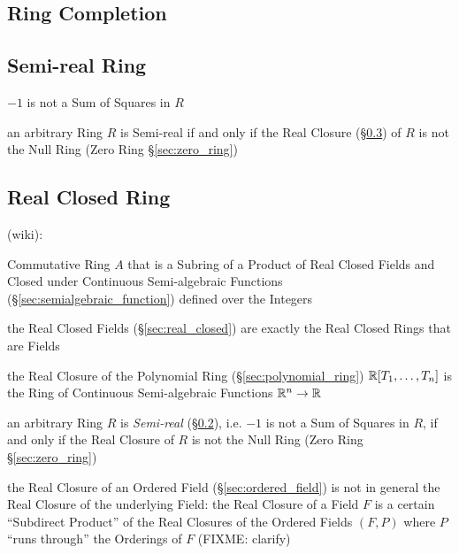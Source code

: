 \begin{itemize}
\subsection{Ring Completion}\label{sec:ring_completion}

\subsection{Semi-real Ring}\label{sec:semireal_ring}

$-1$ is not a Sum of Squares in $R$

an arbitrary Ring $R$ is Semi-real if and only if the Real Closure
(\S\ref{sec:real_closed_ring}) of $R$ is not the Null Ring
(Zero Ring \S\ref{sec:zero_ring})



\subsection{Real Closed Ring}\label{sec:real_closed_ring}

(wiki):

Commutative Ring $A$ that is a Subring of a Product of Real Closed Fields and
Closed under Continuous Semi-algebraic Functions
(\S\ref{sec:semialgebraic_function}) defined over the Integers

the Real Closed Fields (\S\ref{sec:real_closed}) are exactly the Real Closed
Rings that are Fields

the Real Closure of the Polynomial Ring (\S\ref{sec:polynomial_ring})
$\mathbb{R}[T_1,\ldots,T_n]$ is the Ring of Continuous Semi-algebraic Functions
$\mathbb{R}^n \rightarrow \mathbb{R}$

an arbitrary Ring $R$ is \emph{Semi-real} (\S\ref{sec:semireal_ring}), i.e.
$-1$ is not a Sum of Squares in $R$, if and only if the Real Closure of $R$ is
not the Null Ring (Zero Ring \S\ref{sec:zero_ring})

the Real Closure of an Ordered Field (\S\ref{sec:ordered_field}) is not in
general the Real Closure of the underlying Field: the Real Closure of a Field
$F$ is a certain ``Subdirect Product'' of the Real Closures of the Ordered
Fields $(F,P)$ where $P$ ``runs through'' the Orderings of $F$ (FIXME: clarify)


\end{itemize}
